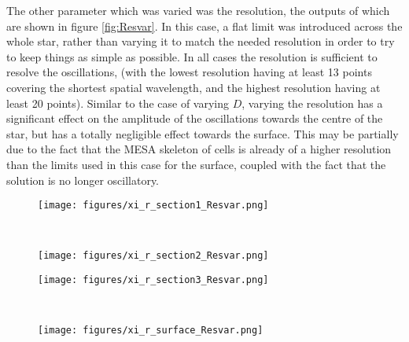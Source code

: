 \documentclass[11pt]{amsart}
\begin{document}
The other parameter which was varied was the resolution, the outputs of which are shown in figure \ref{fig:Resvar}.  In this case, a flat limit was introduced across the whole star, rather than varying it to match the needed resolution in order to try to keep things as simple as possible.  In all cases the resolution is sufficient to resolve the oscillations, (with the lowest resolution having at least 13 points covering the shortest spatial wavelength, and the highest resolution having at least 20 points).  Similar to the case of varying $D$, varying the resolution has a significant effect on the amplitude of the oscillations towards the centre of the star, but has a totally negligible effect towards the surface.  This may be partially due to the fact that the MESA skeleton of cells is already of a higher resolution than the limits used in this case for the surface, coupled with the fact that the solution is no longer oscillatory.




\begin{sidewaysfigure}[htbp]
\begin{center}
\begin{subfigure}{0.5\textwidth}
\texttt{[image: figures/xi\_r\_section1\_Resvar.png]}
\end{subfigure}
~
\begin{subfigure}{0.5\textwidth}
\texttt{[image: figures/xi\_r\_section2\_Resvar.png]}
\end{subfigure}

\begin{subfigure}{0.5\textwidth}
\texttt{[image: figures/xi\_r\_section3\_Resvar.png]}
\end{subfigure}
~
\begin{subfigure}{0.5\textwidth}
\texttt{[image: figures/xi\_r\_surface\_Resvar.png]}
\end{subfigure}

\caption{The full solution for the non-adiabatic case, showing the peak radial velocity (that is, $m \omega \xi_{r}$) in units of $\frac{m_{p}}{m_{p} + M_{*}}$ m s$^{-1}$, against the proportional radial distance from the centre.  In these figures the maximum cell size, and therefore the resolution limit of the grid, has been varied slightly, leading to a spread in the amplitudes of the oscillations.  The maximum cell size, as a proportion of the stellar radius, is plotted at $6 \times 10^{-5}$ (purple line), $7 \times 10^{-5}$ (green line), $8 \times 10^{-5}$ (blue line), and $9 \times 10^{-5}$ (orange line).}
\label{fig:Resvar}
\end{center}
\end{sidewaysfigure}
\end{document}
